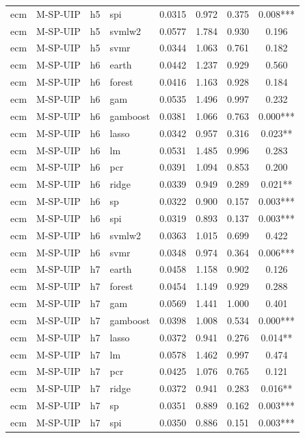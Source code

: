 \begin{ThreePartTable}
\begin{longtable}[t]{llclcccc}
ecm & M-SP-UIP & h5 & spi & 0.0315 & 0.972 & 0.375 & 0.008***\\
ecm & M-SP-UIP & h5 & svmlw2 & 0.0577 & 1.784 & 0.930 & 0.196\\
ecm & M-SP-UIP & h5 & svmr & 0.0344 & 1.063 & 0.761 & 0.182\\
\addlinespace
ecm & M-SP-UIP & h6 & earth & 0.0442 & 1.237 & 0.929 & 0.560\\
ecm & M-SP-UIP & h6 & forest & 0.0416 & 1.163 & 0.928 & 0.184\\
ecm & M-SP-UIP & h6 & gam & 0.0535 & 1.496 & 0.997 & 0.232\\
ecm & M-SP-UIP & h6 & gamboost & 0.0381 & 1.066 & 0.763 & 0.000***\\
ecm & M-SP-UIP & h6 & lasso & 0.0342 & 0.957 & 0.316 & 0.023**\\
ecm & M-SP-UIP & h6 & lm & 0.0531 & 1.485 & 0.996 & 0.283\\
ecm & M-SP-UIP & h6 & pcr & 0.0391 & 1.094 & 0.853 & 0.200\\
ecm & M-SP-UIP & h6 & ridge & 0.0339 & 0.949 & 0.289 & 0.021**\\
ecm & M-SP-UIP & h6 & sp & 0.0322 & 0.900 & 0.157 & 0.003***\\
ecm & M-SP-UIP & h6 & spi & 0.0319 & 0.893 & 0.137 & 0.003***\\
ecm & M-SP-UIP & h6 & svmlw2 & 0.0363 & 1.015 & 0.699 & 0.422\\
ecm & M-SP-UIP & h6 & svmr & 0.0348 & 0.974 & 0.364 & 0.006***\\
\addlinespace
ecm & M-SP-UIP & h7 & earth & 0.0458 & 1.158 & 0.902 & 0.126\\
ecm & M-SP-UIP & h7 & forest & 0.0454 & 1.149 & 0.929 & 0.288\\
ecm & M-SP-UIP & h7 & gam & 0.0569 & 1.441 & 1.000 & 0.401\\
ecm & M-SP-UIP & h7 & gamboost & 0.0398 & 1.008 & 0.534 & 0.000***\\
ecm & M-SP-UIP & h7 & lasso & 0.0372 & 0.941 & 0.276 & 0.014**\\
ecm & M-SP-UIP & h7 & lm & 0.0578 & 1.462 & 0.997 & 0.474\\
ecm & M-SP-UIP & h7 & pcr & 0.0425 & 1.076 & 0.765 & 0.121\\
ecm & M-SP-UIP & h7 & ridge & 0.0372 & 0.941 & 0.283 & 0.016**\\
ecm & M-SP-UIP & h7 & sp & 0.0351 & 0.889 & 0.162 & 0.003***\\
ecm & M-SP-UIP & h7 & spi & 0.0350 & 0.886 & 0.151 & 0.003***\\

\end{longtable}
\end{ThreePartTable}

